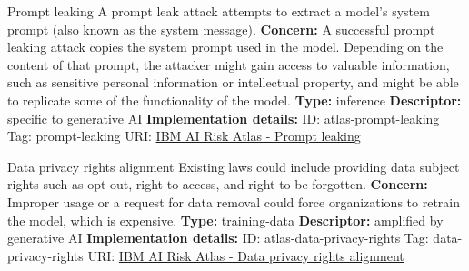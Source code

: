 \begin{definitionbox}{Prompt leaking}
A prompt leak attack attempts to extract a model's system prompt (also known as the system message).\newline\newline
\textbf{Concern: }A successful prompt leaking attack copies the system prompt used in the model. Depending on the content of that prompt, the attacker might gain access to valuable information, such as sensitive personal information or intellectual property, and might be able to replicate some of the functionality of the model.\newline\newline
\textbf{Type: }inference\newline
\textbf{Descriptor: }specific to generative AI \newline\newline
\textbf{Implementation details: } \newline
ID: atlas-prompt-leaking \newline
Tag: prompt-leaking \newline
URI:  \href{https://www.ibm.com/docs/en/watsonx/saas?topic=SSYOK8/wsj/ai-risk-atlas/prompt-leaking.html}{IBM AI Risk Atlas - Prompt leaking}\newline
\end{definitionbox}
\begin{definitionbox}{Data privacy rights alignment}
Existing laws could include providing data subject rights such as opt-out, right to access, and right to be forgotten.\newline\newline
\textbf{Concern: }Improper usage or a request for data removal could force organizations to retrain the model, which is expensive.\newline\newline
\textbf{Type: }training-data\newline
\textbf{Descriptor: }amplified by generative AI \newline\newline
\textbf{Implementation details: } \newline
ID: atlas-data-privacy-rights \newline
Tag: data-privacy-rights \newline
URI:  \href{https://www.ibm.com/docs/en/watsonx/saas?topic=SSYOK8/wsj/ai-risk-atlas/data-privacy-rights.html}{IBM AI Risk Atlas - Data privacy rights alignment}\newline
\end{definitionbox}
